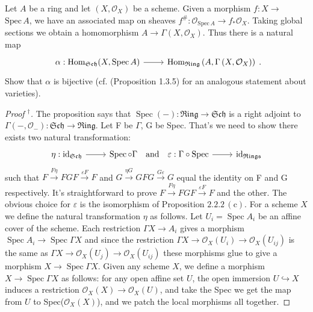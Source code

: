 \begin{exe}
	\label{2.2.4}
	Let $A$ be a ring and let $(X, \mathcal{O}_{X}) $ be a scheme. Given a morphism $f: X \rightarrow$ $\mathrm{Spec}\, A$, we have an associated map on sheaves $f^{\#}: \mathcal{O}_{\mathrm{Spec}\, A} \rightarrow f_{*} \mathcal{O}_{X}$. Taking global sections we obtain a homomorphism $A \rightarrow \Gamma\left(X, \mathcal{O}_{X}\right) .$ Thus there is a natural map
	\begin{equation*}
		\begin{tikzcd}
			{\alpha: \operatorname{Hom}_{\mathfrak{S c h}}(X, \operatorname{Spec} A)} \arrow[r] & {\operatorname{Hom}_{\mathfrak{R i n g}}\left(A, \Gamma\left(X, \mathcal{O}_{X}\right)\right)}
		\end{tikzcd}.
	\end{equation*}
	Show that $\alpha$ is bijective \textup{(cf. (Proposition 1.3.5) for an analogous statement about varieties)}.
\end{exe}
\begin{proof}[Proof $^\dag$]
	The proposition says that $\operatorname{Spec}(-):\mathfrak{R i n g} \rightarrow \mathfrak{Sch} $ is a right adjoint to $\Gamma\left(-, \mathcal{O}_{-}\right): \mathfrak{S c h} \rightarrow \mathfrak{R i n g}$.  Let F be $\Gamma$, G be Spec. That's we need to show there exists two natural transformation:
	\begin{equation*}
		\begin{tikzcd}
			\eta: \mathrm{i d}_{\mathfrak{S c h}} \arrow[r] & \operatorname{Spec} \circ \Gamma\quad \text{and}\quad \varepsilon:\Gamma \circ \mathrm{Spec} \arrow[r] & \mathrm{i d}_{\mathfrak{Rings}}
		\end{tikzcd}
	\end{equation*}
	such that
	$F \xrightarrow{F \eta} F G F \xrightarrow{\varepsilon F} F$ and $G \xrightarrow{\eta G}G F G \xrightarrow{G \varepsilon} G$ equal the identity on F and G respectively. It's straightforward to prove $F \xrightarrow{F \eta} F G F \xrightarrow{\varepsilon F} F$ and the other. The obvious choice for $\varepsilon$ is the isomorphism of Proposition $2.2.2\,(\mathrm{c})$.  For a scheme $X$ we define the natural transformation $\eta$ as follows. Let $U_{i}=\operatorname{Spec} A_{i}$ be an affine cover of the scheme. Each restriction $\Gamma X \rightarrow A_{i}$ gives a morphism $\operatorname{Spec} A_{i} \rightarrow \operatorname{Spec} \Gamma X$ and since the restriction $\Gamma X \rightarrow \mathcal{O}_{X}\left(U_{i}\right) \rightarrow \mathcal{O}_{X}\left(U_{i j}\right)$ is the
	same as $\Gamma X \rightarrow \mathcal{O}_{X}\left(U_{j}\right) \rightarrow \mathcal{O}_{X}\left(U_{i j}\right)$ these morphisms glue to give a morphism $X \rightarrow \operatorname{Spec} \Gamma X$. Given any scheme $X$, we define a morphism $X \rightarrow \operatorname{Spec} \Gamma X$ as follows: for any open affine set $U$, the open immersion $U\hookrightarrow X$ induces a restriction $\mathcal{O}_{X}(X)\rightarrow \mathcal{O}_{X}(U)$, and take the Spec we get the map from $U$ to Spec($\mathcal{O}_{X}(X)$), and we patch the local morphisms all together.
\end{proof}
